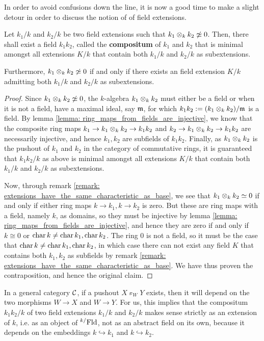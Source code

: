         In order to avoid confusions down the line, it is now a good time to make a slight detour in order to discuss the notion of  of field extensions.  
        \begin{proposition} \label{prop: composite_fields}
            Let $k_1/k$ and $k_2/k$ be two field extensions such that $k_1 \tensor_k k_2 \not \cong 0$. Then, there shall exist a field $k_1 k_2$, called the \textbf{compositum} of $k_1$ and $k_2$ that is minimal amongst all extensions $K/k$ that contain both $k_1/k$ and $k_2/k$ as subextensions.

            Furthermore, $k_1 \tensor_k k_2 \not \cong 0$ if and only if there exists an  field extension $K/k$ admitting both $k_1/k$ and $k_2/k$ as subextensions.
        \end{proposition}
            \begin{proof}
                Since $k_1 \tensor_k k_2 \not \cong 0$, the $k$-algebra $k_1 \tensor_k k_2$ must either be a field or when it is not a field, have a maximal ideal, say $\mathfrak{m}$, for which $k_1 k_2 := (k_1 \tensor_k k_2)/\m$ is a field. By lemma \ref{lemma: ring_maps_from_fields_are_injective}, we know that the composite ring maps $k_1 \to k_1 \tensor_k k_2 \to k_1 k_2$ and $k_2 \to k_1 \tensor_k k_2 \to k_1 k_2$ are necessarily injective, and hence $k_1, k_2$ are subfields of $k_1 k_2$. Finally, as $k_1 \tensor_k k_2$ is the pushout of $k_1$ and $k_2$ in the category of commutative rings, it is guaranteed that $k_1 k_2/k$ as above is minimal amongst all extensions $K/k$ that contain both $k_1/k$ and $k_2/k$ as subextensions.

                Now, through remark \ref{remark: extensions_have_the_same_characteristic_as_base}, we see that $k_1 \tensor_k k_2 \cong 0$ if and only if either ring maps $k \to k_1, k \to k_2$ is zero. But these are ring maps with a field, namely $k$, as domains, so they must be injective by lemma \ref{lemma: ring_maps_from_fields_are_injective}, and hence they are zero if and only if $k \cong 0$ or $\operatorname{char} k \not = \operatorname{char} k_1, \operatorname{char} k_2$. The ring $0$ is not a field, so it must be the case that $\operatorname{char} k \not = \operatorname{char} k_1, \operatorname{char} k_2$, in which case there can not exist any field $K$ that contains both $k_1, k_2$ as subfields by remark \ref{remark: extensions_have_the_same_characteristic_as_base}. We have thus proven the contraposition, and hence the original claim.
            \end{proof}
        \begin{remark}
            In a general category $\mathcal{C}$, if a pushout $X \pushout_W Y$ exists, then it will depend on the two morphisms $W \to X$ and $W \to Y$. For us, this implies that the compositum $k_1 k_2/k$ of two field extensions $k_1/k$ and $k_2/k$ makes sense strictly as an extension of $k$, i.e. as an object of ${}^{k/}\mathrm{Fld}$, not as an abstract field on its own, because it depends on the embeddings $k \hookrightarrow k_1$ and $k \hookrightarrow k_2$.
        \end{remark}
